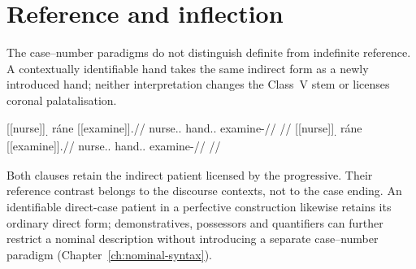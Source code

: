 \FloatBarrier

\section{Reference and inflection}
\label{sec:nm-reference-inflection}

The case--number paradigms do not distinguish definite from indefinite
reference. A contextually identifiable hand takes the same indirect form
 as a newly introduced hand; neither interpretation changes the
Class~V stem or licenses coronal palatalisation.

\pex\label{ex:nm-slot-contextual-patient}
\a
\begingl
\gla \textnormal{[[nurse]]}\textsubscript{\Dir{}.\Sg{}} ráne \textnormal{[[examine]]}\textsubscript{\Prog{}}.//
\glb nurse.\Dir{}.\Sg{} hand.\Ind{}.\Sg{} examine-\Prog{}//
\glft {} //
\endgl
\a
\begingl
\gla \textnormal{[[nurse]]}\textsubscript{\Dir{}.\Sg{}} ráne \textnormal{[[examine]]}\textsubscript{\Prog{}}.//
\glb nurse.\Dir{}.\Sg{} hand.\Ind{}.\Sg{} examine-\Prog{}//
\glft {} //
\endgl
\xe

Both clauses retain the indirect patient licensed by the progressive. Their
reference contrast belongs to the discourse contexts, not to the case ending.
An identifiable direct-case patient in a perfective construction likewise
retains its ordinary direct form; demonstratives, possessors and quantifiers
can further restrict a nominal description without introducing a separate
case--number paradigm (Chapter~\ref{ch:nominal-syntax}).
